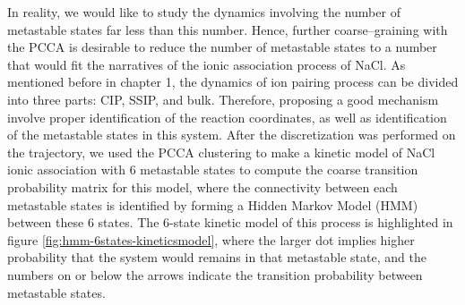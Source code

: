 \begin{spacing}{2.0}
    In reality, we would like to study the dynamics involving the number of metastable states far less than this number. Hence, further coarse--graining 
    with the PCCA is desirable to reduce the number of metastable states to a number that would fit the narratives of the ionic association process 
    of NaCl. As mentioned before in chapter 1, the dynamics of ion pairing process can be divided into three parts: CIP, SSIP, and bulk. Therefore, 
    proposing a good mechanism involve proper identification of the reaction coordinates, as well as identification of the metastable states in 
    this system. After the discretization was performed on the trajectory, we used the PCCA clustering to make a kinetic model of NaCl ionic 
    association with 6 metastable states to compute the coarse transition probability matrix for this model, where the connectivity between each 
    metastable states is identified by forming a Hidden Markov Model (HMM) between these 6 states. The 6-state kinetic model of this process is 
    highlighted in figure \ref{fig:hmm-6states-kineticsmodel}, where the larger dot implies higher probability that the system would remains in 
    that metastable state, and the numbers on or below the arrows indicate the transition probability between metastable states.


\end{spacing}
